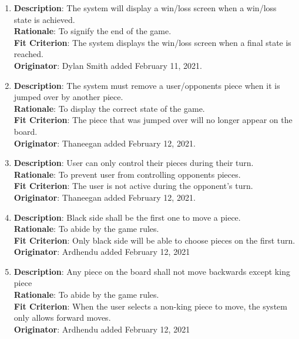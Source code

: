 \documentclass[12pt, titlepage]{article}
\begin{document}
\begin{enumerate}[{FR}1.]
    \item\textbf{Description}: The system will display a win/loss screen when a win/loss state is achieved.\\
        \textbf{Rationale}: To signify the end of the game.\\
        \textbf{Fit Criterion}: The system displays the win/loss screen when a final state is reached.\\
        \textbf{Originator}: Dylan Smith added February 11, 2021.
    
     \item\textbf{Description}: The system must remove a user/opponents piece when it is jumped over by another piece.  \\
        \textbf{Rationale}: To display the correct state of the game.\\
        \textbf{Fit Criterion}: The piece that was jumped over will no longer appear on the board.\\
        \textbf{Originator}: Thaneegan added February 12, 2021.
        
    \item\textbf{Description}: User can only control their pieces during their turn.\\
        \textbf{Rationale}: To prevent user from controlling opponents pieces. \\
        \textbf{Fit Criterion}: The user is not active during the opponent's turn. \\
        \textbf{Originator}: Thaneegan added February 12, 2021.  
        
    \item\textbf{Description}: Black side shall be the first one to move a piece.\\
        \textbf{Rationale}: To abide by the game rules.\\
        \textbf{Fit Criterion}:  Only black side will be able to choose pieces on the first turn.\\
        \textbf{Originator}: Ardhendu added February 12, 2021 
        
    \item\textbf{Description}: Any piece on the board shall not move backwards except king piece\\
        \textbf{Rationale}: To abide by the game rules. \\
        \textbf{Fit Criterion}: When the user selects a non-king piece to move, the system only allows forward moves.\\
        \textbf{Originator}: Ardhendu added February 12, 2021 
    

\end{enumerate}
\end{document}
